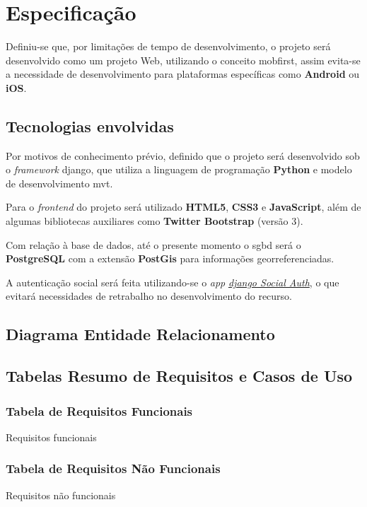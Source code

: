 \chapter{Especificação}\label{chp: Especificação}
Definiu-se que, por limitações de tempo de desenvolvimento, o projeto será desenvolvido como um projeto Web, utilizando o conceito \gls{mobfirst}, assim evita-se a necessidade de desenvolvimento para plataformas específicas como \textbf{Android} ou \textbf{iOS}.

\section{Tecnologias envolvidas}\label{sec: TecEnvolv}
Por motivos de conhecimento prévio, definido que o projeto será desenvolvido sob o \textit{framework} \gls{django}, que utiliza a linguagem de programação \textbf{Python} e modelo de desenvolvimento \gls{mvt}.

Para o \textit{frontend} do projeto será utilizado \textbf{HTML5}, \textbf{CSS3} e \textbf{JavaScript}, além de algumas bibliotecas auxiliares como \textbf{Twitter Bootstrap} (versão 3).

Com relação à base de dados, até o presente momento o \gls{sgbd} será o \textbf{PostgreSQL} com a extensão \textbf{PostGis} para informações georreferenciadas.

A autenticação social será feita utilizando-se o \textit{app} \textit{\href{https://django-social-auth.readthedocs.org/en/latest/}{django Social Auth}}, o que evitará necessidades de retrabalho no desenvolvimento do recurso.

\section{Diagrama Entidade Relacionamento}





\section{Tabelas Resumo de Requisitos e Casos de Uso}
\subsection{Tabela de Requisitos Funcionais}\label{subsec:tabResReqF}
   \begin{table}[H]
        \centering
        \caption{Requisitos funcionais}
        \label{tab:reqFunc}
        \PrintRequisitosFunc
    \end{table}
    

\subsection{Tabela de Requisitos Não Funcionais}\label{subsec:tabResReqNF}
   \begin{table}[H]
        \centering
        \caption{Requisitos não funcionais}
        \label{tab:reqNFunc}
        \PrintRequisitosNFunc
    \end{table}

